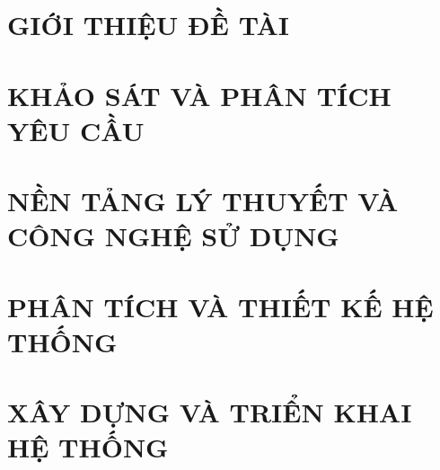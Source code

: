 \documentclass[a4paper,13pt,3p,twoside]{report}
\theoremstyle{definition}
\begin{document}
\glsaddall 
 \renewcommand*{\glossaryname}{Danh sách thuật ngữ}
\renewcommand*{\acronymname}{DANH MỤC THUẬT NGỮ VÀ TỪ VIẾT TẮT}
\renewcommand*{\entryname}{Thuật ngữ}
\renewcommand*{\descriptionname}{Ý nghĩa}
\printnoidxglossaries


% 


\newpage
{}

\pagestyle{fancy}
\fancyhf{}
\fancyhead[RE, LO]{\leftmark}
\fancyfoot[RE, LO]{\thepage}

\chapter{GIỚI THIỆU ĐỀ TÀI}
\label{chapter:Introduction}

\newpage
\chapter{KHẢO SÁT VÀ PHÂN TÍCH YÊU CẦU}
\label{chapter:Related_works}



\newpage
\chapter{NỀN TẢNG LÝ THUYẾT VÀ CÔNG NGHỆ SỬ DỤNG}
\label{chapter:Methodology}


\newpage
\chapter{PHÂN TÍCH VÀ THIẾT KẾ HỆ THỐNG}
\label{chapter:Design}


\newpage
\chapter{XÂY DỰNG VÀ TRIỂN KHAI HỆ THỐNG}
\label{chapter:Implementation}


\newpage
\end{document}
